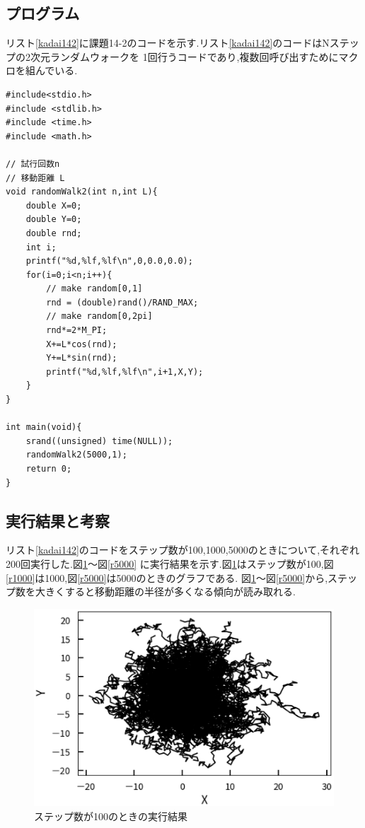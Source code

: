 \documentclass[a4j]{jarticle}
\begin{document}
          \subsection{プログラム}
          リスト\ref{kadai142}に課題14-2のコードを示す.リスト\ref{kadai142}のコードはNステップの2次元ランダムウォークを
          1回行うコードであり,複数回呼び出すためにマクロを組んでいる.
          \begin{lstlisting}[basicstyle=\ttfamily\footnotesize, frame=single,label=kadai142,caption=課題14-2のコード]
#include<stdio.h>
#include <stdlib.h>
#include <time.h>
#include <math.h>

// 試行回数n
// 移動距離 L
void randomWalk2(int n,int L){
    double X=0;
    double Y=0;
    double rnd;
    int i;
    printf("%d,%lf,%lf\n",0,0.0,0.0);
    for(i=0;i<n;i++){
        // make random[0,1]
        rnd = (double)rand()/RAND_MAX;
        // make random[0,2pi]
        rnd*=2*M_PI;
        X+=L*cos(rnd);
        Y+=L*sin(rnd);
        printf("%d,%lf,%lf\n",i+1,X,Y);
    }
}

int main(void){
    srand((unsigned) time(NULL));
    randomWalk2(5000,1);
    return 0;
}
          \end{lstlisting}

          \subsection{実行結果と考察}
          リスト\ref{kadai142}のコードをステップ数が100,1000,5000のときについて,それぞれ200回実行した.図\ref{r100}～図\ref{r5000}
          に実行結果を示す.図\ref{r100}はステップ数が100,図\ref{r1000}は1000,図\ref{r5000}は5000のときのグラフである.
          図\ref{r100}～図\ref{r5000}から,ステップ数を大きくすると移動距離の半径が多くなる傾向が読み取れる.

          \begin{figure}[H]
            \centering
            \includegraphics[scale=0.6]{r2-100.eps}
            \caption{ステップ数が100のときの実行結果}
            \label{r100}
            \end{figure}   
        
\end{document}
